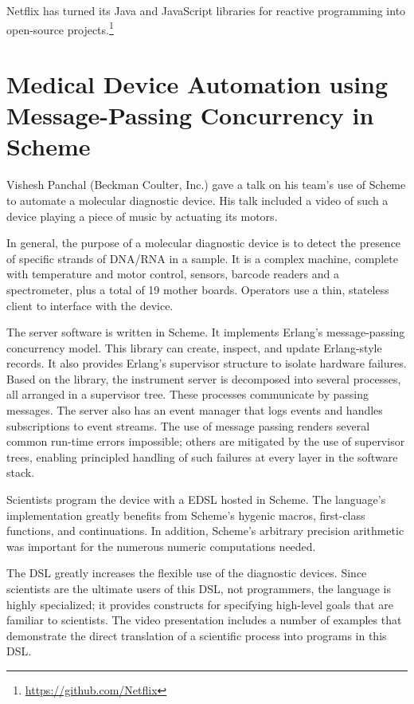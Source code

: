 \documentclass{jfp1}
\begin{document}
Netflix has turned its Java and JavaScript libraries for reactive
programming into open-source
projects.\footnote{\url{https://github.com/Netflix}}

\section{Medical Device Automation using Message-Passing Concurrency in Scheme}


Vishesh Panchal (Beckman Coulter, Inc.) gave a talk on his team's use of
Scheme to automate a molecular diagnostic device. His talk included a
video of such a device playing a piece of music by actuating its motors.

In general, the purpose of a molecular diagnostic device is to detect the
presence of specific strands of DNA/RNA in a sample. It is a complex
machine, complete with temperature and motor control, sensors, barcode
readers and a spectrometer, plus a total of 19 mother boards. Operators
use a thin, stateless client to interface with the device.  

The server software is written in Scheme. It implements Erlang's
message-passing concurrency model. This library can create, inspect, and
update Erlang-style records. It also provides Erlang's supervisor
structure to isolate hardware failures. Based on the library, the
instrument server is decomposed into several processes, all arranged in a
supervisor tree. These processes communicate by passing messages. The
server also has an event manager that logs events and handles
subscriptions to event streams. The use of message passing renders several
common run-time errors impossible; others are mitigated by the use of
supervisor trees, enabling principled handling of such failures at every
layer in the software stack.

Scientists program the device with a EDSL hosted in Scheme. The language's
implementation greatly benefits from Scheme's hygenic macros, first-class
functions, and continuations. In addition, Scheme's arbitrary precision
arithmetic was important for the numerous numeric computations needed.

The DSL greatly increases the flexible use of the diagnostic devices.
Since scientists are the ultimate users of this DSL, not programmers, the
language is highly specialized; it provides constructs for specifying
high-level goals that are familiar to scientists. The video presentation
includes a number of examples that demonstrate the direct translation of a
scientific process into programs in this DSL. 
\end{document}
